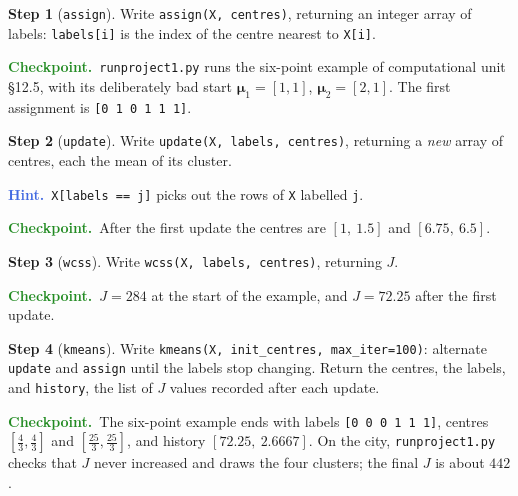 \documentclass[11pt]{article}
\theoremstyle{definition}
\newtheorem{step}{Step}[section]
\newcommand{\hint}[1]{\par\smallskip\noindent
  {\small\sffamily\textcolor{RoyalBlue}{\textbf{Hint.}}\ #1}\par\smallskip}
\newcommand{\checkpoint}[1]{\par\smallskip\noindent
  {\small\sffamily\textcolor{ForestGreen}{\textbf{Checkpoint.}}\ #1}\par\smallskip}
\newcommand{\bmu}{\boldsymbol{\mu}}
\newcommand{\file}[1]{\texttt{#1}}
\begin{document}
\begin{step}[\texttt{assign}]
Write \texttt{assign(X, centres)}, returning an integer array of labels:
\texttt{labels[i]} is the index of the centre nearest to \texttt{X[i]}.
\checkpoint{\file{runproject1.py} runs the six-point example of computational unit
\S12.5, with its deliberately bad start $\bmu_1=[1,1]$, $\bmu_2=[2,1]$. The
first assignment is \texttt{[0 1 0 1 1 1]}.}
\end{step}

\begin{step}[\texttt{update}]
Write \texttt{update(X, labels, centres)}, returning a \emph{new} array of
centres, each the mean of its cluster.
\hint{\texttt{X[labels == j]} picks out the rows of \texttt{X} labelled
\texttt{j}.}
\checkpoint{After the first update the centres are $[1,\ 1.5]$ and
$[6.75,\ 6.5]$.}
\end{step}

\begin{step}[\texttt{wcss}]
Write \texttt{wcss(X, labels, centres)}, returning $J$.
\checkpoint{$J=284$ at the start of the example, and $J=72.25$ after the first
update.}
\end{step}

\begin{step}[\texttt{kmeans}]
Write \texttt{kmeans(X, init\_centres, max\_iter=100)}: alternate
\texttt{update} and \texttt{assign} until the labels stop changing. Return the
centres, the labels, and \texttt{history}, the list of $J$ values recorded after
each update.
\checkpoint{The six-point example ends with labels \texttt{[0 0 0 1 1 1]},
centres $[\tfrac43,\tfrac43]$ and $[\tfrac{25}{3},\tfrac{25}{3}]$, and
history $[72.25,\ 2.6667]$. On the city, \file{runproject1.py} checks that $J$ never
increased and draws the four clusters; the final $J$ is about $442$.}
\end{step}
\end{document}
